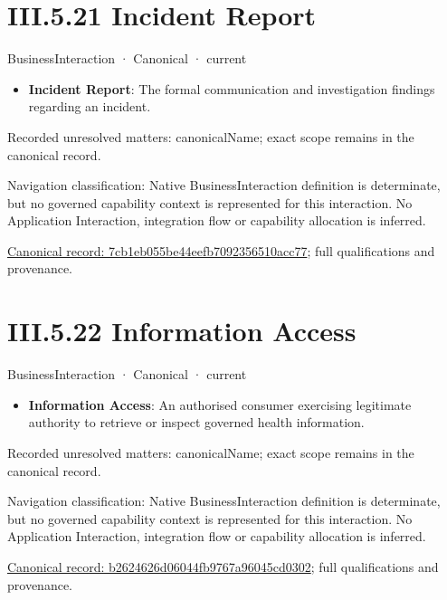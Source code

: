 \section*{III.5.21 Incident Report}
\label{navigation:III.5.21}

\label{element:7cb1eb055be44eefb7092356510acc77}
{\small BusinessInteraction · Canonical · current}\par

\begin{itemize}


\item \textbf{Incident Report}: The formal communication and investigation findings regarding an incident.

\end{itemize}

{\small Recorded unresolved matters: canonicalName; exact scope remains in the canonical record.}\par
{\small Navigation classification: Native BusinessInteraction definition is determinate, but no governed capability context is represented for this interaction. No Application Interaction, integration flow or capability allocation is inferred.}\par
{\footnotesize \href{../../../../continuum/business/business-interaction/7cb1eb055be44eefb7092356510acc77.md}{Canonical record: 7cb1eb055be44eefb7092356510acc77}; full qualifications and provenance.}\par
\section*{III.5.22 Information Access}
\label{navigation:III.5.22}

\label{element:b2624626d06044fb9767a96045cd0302}
{\small BusinessInteraction · Canonical · current}\par

\begin{itemize}


\item \textbf{Information Access}: An authorised consumer exercising legitimate authority to retrieve or inspect governed health information.

\end{itemize}

{\small Recorded unresolved matters: canonicalName; exact scope remains in the canonical record.}\par
{\small Navigation classification: Native BusinessInteraction definition is determinate, but no governed capability context is represented for this interaction. No Application Interaction, integration flow or capability allocation is inferred.}\par
{\footnotesize \href{../../../../continuum/business/business-interaction/b2624626d06044fb9767a96045cd0302.md}{Canonical record: b2624626d06044fb9767a96045cd0302}; full qualifications and provenance.}\par
